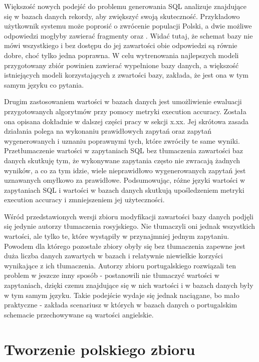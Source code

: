 Większość nowych podejść do problemu generowania SQL analizuje znajdujące się w bazach danych rekordy, aby zwiększyć swoją skuteczność. Przykładowo użytkownik systemu może poprosić o zwrócenie populacji Polski, a dwie możliwe odpowiedzi mogłyby zawierać fragmenty  oraz . Widać tutaj, że schemat bazy nie mówi wszystkiego i bez dostępu do jej zawartości obie odpowiedzi są równie dobre, choć tylko jedna poprawna. W celu wytrenowania najlepszych modeli przygotowany zbiór powinien zawierać wypełnione bazy danych, a większość istniejących modeli korzystających z zwartości bazy, zakłada, że jest ona w tym samym języku co pytania.

Drugim zastosowaniem wartości w bazach danych jest umożliwienie ewaluacji przygotowanych algorytmów przy pomocy metryki execution accuracy. Została ona opisana dokładnie w dalszej części pracy w sekcji x.xx. Jej skrótowa zasada działania polega na wykonaniu prawidłowych zapytań oraz zapytań wygenerowanych i uznaniu poprawnymi tych, które zwróciły te same wyniki. Przetłumaczenie wartości w zapytaniach SQL bez tłumaczenia zawartości baz danych skutkuję tym, że wykonywane zapytania często nie zwracają żadnych wyników, a co za tym idzie, wiele nieprawidłowo wygenerowanych zapytań jest uznawanych omyłkowo za prawidłowe. Podsumowując, różne języki wartości w zapytaniach SQL i wartości w bazach danych skutkują upośledzeniem metryki execution accuracy i zmniejszeniem jej użyteczności.

Wśród przedstawionych wersji zbioru  modyfikacji zawartości bazy danych podjęli się jedynie autorzy tłumaczenia rosyjskiego. Nie tłumaczyli oni jednak wszystkich wartości, ale tylko te, które wystąpiły w przynajmniej jednym zapytaniu. Powodem dla którego pozostałe zbiory obyły się bez tłumaczenia zapewne jest duża liczba danych zawartych w bazach i relatywnie niewielkie korzyści wynikające z ich tłumaczenia. Autorzy zbioru portugalskiego rozwiązali ten problem w jeszcze inny sposób - postanowili nie tłumaczyć wartości w zapytaniach, dzięki czemu znajdujące się w nich wartości i w bazach danych były w tym samym języku. Takie podejście wydaje się jednak naciągane, bo mało praktyczne - zakłada scenariusz w których w bazach danych o portugalskim schemacie przechowywane są wartości angielskie.

\chapter{Tworzenie polskiego zbioru}

